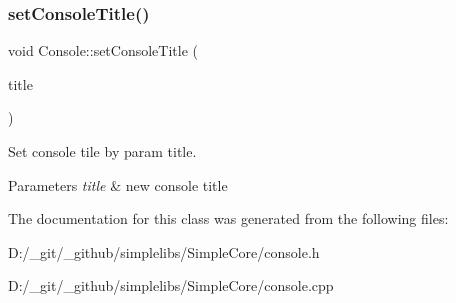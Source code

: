 \subsubsection{\texorpdfstring{setConsoleTitle()}{setConsoleTitle()}}
{\footnotesize\ttfamily void Console\+::set\+Console\+Title (\begin{DoxyParamCaption}\item[{const \mbox{\hyperlink{class_a_string}{A\+String}} \&}]{title }\end{DoxyParamCaption})\hspace{0.3cm}{\ttfamily [static]}}



Set console tile by param title. 


\begin{DoxyParams}{Parameters}
{\em title} & new console title \\
\hline
\end{DoxyParams}


The documentation for this class was generated from the following files\+:\begin{DoxyCompactItemize}
\item 
D\+:/\+\_\+git/\+\_\+github/simplelibs/\+Simple\+Core/console.\+h\item 
D\+:/\+\_\+git/\+\_\+github/simplelibs/\+Simple\+Core/console.\+cpp\end{DoxyCompactItemize}
